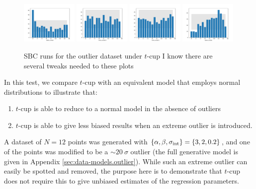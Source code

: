 \documentclass[fleqn,usenatbib]{mnras}
\begin{document}
\begin{figure}
    \includegraphics[width=0.24\textwidth]{graphics/sbc_outlier_tcup/alpha_scaled.pdf}
    \includegraphics[width=0.24\textwidth]{graphics/sbc_outlier_tcup/beta_scaled.0.pdf}
    \includegraphics[width=0.24\textwidth]{graphics/sbc_outlier_tcup/beta_scaled.1.pdf}
    \includegraphics[width=0.24\textwidth]{graphics/sbc_outlier_tcup/sigma_scaled.pdf}
    \caption{SBC runs for the outlier dataset under $t$-cup {\color{red} I know
    there are several tweaks needed to these plots}}
    \label{fig:results.t.sbc}
\end{figure}

In this test, we compare $t$-cup with an equivalent model that employs normal
distributions to illustrate that:
\begin{enumerate}
    \item $t$-cup is able to reduce to a normal model in the absence of outliers
    \item $t$-cup is able to give less biased results when an extreme outlier is
          introduced.
\end{enumerate}
A dataset of $N = 12$ points was generated with $\{\alpha, \beta, \sigma_{\rm
int}\} = \{3, 2, 0.2\}$, and one of the points was modified to be a
$\sim20~\sigma$ outlier (the full generative model is given in Appendix
\ref{sec:data-models.outlier}). While such an extreme outlier can easily be
spotted and removed, the purpose here is to demonstrate that $t$-cup does not
require this to give {\color{red} unbiased} estimates of the regression
parameters.
\end{document}
